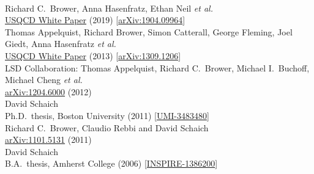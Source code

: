\begin{spacelistout}
\begin{revnumerate}
    \pagebreakitem
       \\
      Richard C.~Brower, Anna Hasenfratz, Ethan Neil \textit{et al.} \\ %
      \href{http://home.fnal.gov/~ask/USQCD/members/WP/BSMwhitepaper2018.pdf}{USQCD White Paper} (2019) [\href{http://arxiv.org/abs/1904.09964}{arXiv:1904.09964}]
    \pagebreakitem
       \\
      Thomas Appelquist, Richard Brower, Simon Catterall, George Fleming, Joel Giedt, Anna Hasenfratz \textit{et al.} \\ %
      \href{http://www.usqcd.org/documents/13BSM.pdf}{USQCD White Paper} (2013) [\href{http://arxiv.org/abs/1309.1206}{arXiv:1309.1206}]
    \pagebreakitem
       \\
      LSD Collaboration: Thomas Appelquist, Richard C.~Brower, Michael I.~Buchoff, Michael Cheng \textit{et al.} \\ %
      \href{http://arxiv.org/abs/1204.6000}{arXiv:1204.6000} (2012)
    \pagebreakitem
       \\
      David Schaich \\
      Ph.D.\ thesis, Boston University (2011) [\href{http://gradworks.umi.com/34/83/3483480.html}{UMI-3483480}]
    \pagebreakitem
       \\
      Richard C.~Brower, Claudio Rebbi and David Schaich \\
      \href{http://arxiv.org/abs/1101.5131}{arXiv:1101.5131} (2011)
    \pagebreakitem
       \\
      David Schaich \\
      B.A.\ thesis, Amherst College (2006) [\href{http://inspirehep.net/record/1386200}{INSPIRE-1386200}] \\
%
%
%

\end{revnumerate}
\end{spacelistout}
